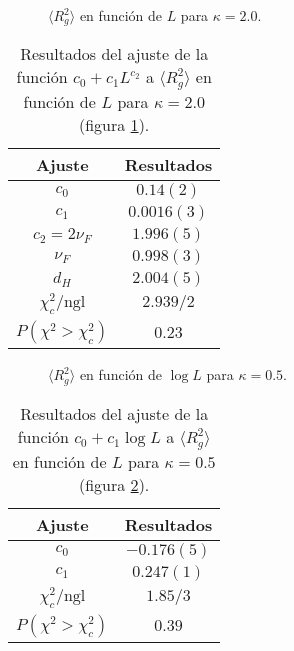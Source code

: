 \begin{figure}[h]
  \centering
  
  \caption{$\langle R^2_g \rangle$ en función de $L$ para $\kappa=2.0$.}\label{Rg2_plana-fig}
\end{figure}

\begin{table}[h]
\centering
\begin{tabular}{|c|c|}\hline
 Ajuste              & Resultados \\ \hline\hline
 $c_0$               & $0.14(2) $  \\ \hline
 $c_1$               & $0.0016(3)$ \\ \hline
 $c_2=2\nu_F$        &  $1.996(5)$ \\ \hline
 $\nu_F$             & $ 0.998(3)$ \\ \hline
$ d_H$               & $ 2.004(5)$ \\ \hline
$\chi_c^2/\mathrm{ngl}$        &  $2.939/2$  \\ \hline
 $P(\chi^2>\chi_c^2)$&  $0.23$    \\ \hline
\end{tabular}
\caption{Resultados del ajuste de la función $c_0+c_1L^{c_2}$ a $\langle R^2_g
  \rangle$ en función de $L$ para $\kappa=2.0$ (figura \ref{Rg2_plana-fig}).}\label{Rg2_plana-tab}
\end{table}
\clearpage

\begin{figure}[h]
  \centering
  
   \caption{$\langle R^2_g \rangle$ en función de $\log L$ para $\kappa=0.5$.}\label{rg2_rugosa-fig}
\end{figure}

\begin{table}[h]
\centering
\begin{tabular}{|c|c|}\hline
 Ajuste              & Resultados \\ \hline\hline
 $c_0$               & $-0.176(5) $  \\ \hline
 $c_1$               & $0.247(1)$ \\ \hline
 $\chi_c^2/\mathrm{ngl}$       &  $1.85/3$  \\ \hline
 $P(\chi^2>\chi_c^2)$&  $0.39$    \\ \hline
\end{tabular}
\caption{Resultados del ajuste de la función $c_0+c_1\log L$ a $\langle R^2_g
  \rangle$ en función de $L$ para $\kappa=0.5$ (figura \ref{rg2_rugosa-fig}).}\label{rg2_rugosa-tab}
\end{table}

